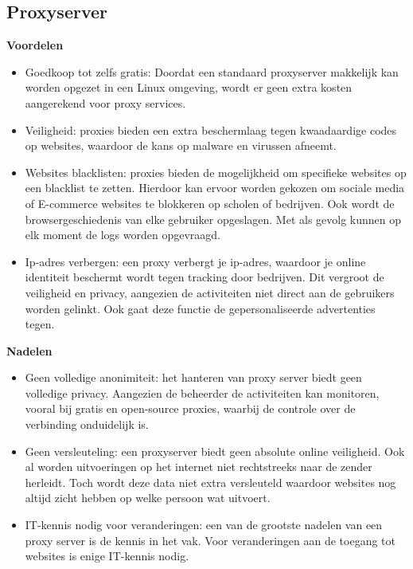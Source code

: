 \subsection{Proxyserver}
\textbf{Voordelen}
\begin{itemize}
    \item Goedkoop tot zelfs gratis: Doordat een standaard proxyserver makkelijk kan worden opgezet in een Linux omgeving, wordt er geen extra kosten aangerekend voor proxy services. 
    \item Veiligheid: proxies bieden een extra beschermlaag tegen kwaadaardige codes op websites, waardoor de kans op malware en virussen afneemt.
    \item Websites blacklisten: proxies bieden de mogelijkheid om specifieke websites op een blacklist te zetten. Hierdoor kan ervoor worden gekozen om sociale media of E-commerce websites te blokkeren op scholen of bedrijven. Ook wordt de browsergeschiedenis van elke gebruiker opgeslagen. Met als gevolg kunnen op elk moment de logs worden opgevraagd. 
    \item Ip-adres verbergen: een proxy verbergt je ip-adres, waardoor je online identiteit beschermt wordt tegen tracking door bedrijven. Dit vergroot de veiligheid en privacy, aangezien de activiteiten niet direct aan de gebruikers worden gelinkt. Ook gaat deze functie de gepersonaliseerde advertenties tegen.
    \autocite{Janssen2023}  
\end{itemize}
\textbf{Nadelen}
\begin{itemize}
    \item Geen volledige anonimiteit: het hanteren van proxy server biedt geen volledige privacy. Aangezien de beheerder de activiteiten kan monitoren, vooral bij gratis en open-source proxies, waarbij de controle over de verbinding onduidelijk is.
    \item Geen versleuteling: een proxyserver biedt geen absolute online veiligheid. Ook al worden uitvoeringen op het internet niet rechtstreeks naar de zender herleidt. Toch wordt deze data niet extra versleuteld waardoor websites nog altijd zicht hebben op welke persoon wat uitvoert. 
    \item IT-kennis nodig voor veranderingen: een van de grootste nadelen van een proxy server is de kennis in het vak. Voor veranderingen aan de toegang tot websites is enige IT-kennis nodig. 
    \autocite{proxyserver}
    \autocite{nordvpn}
\end{itemize}






